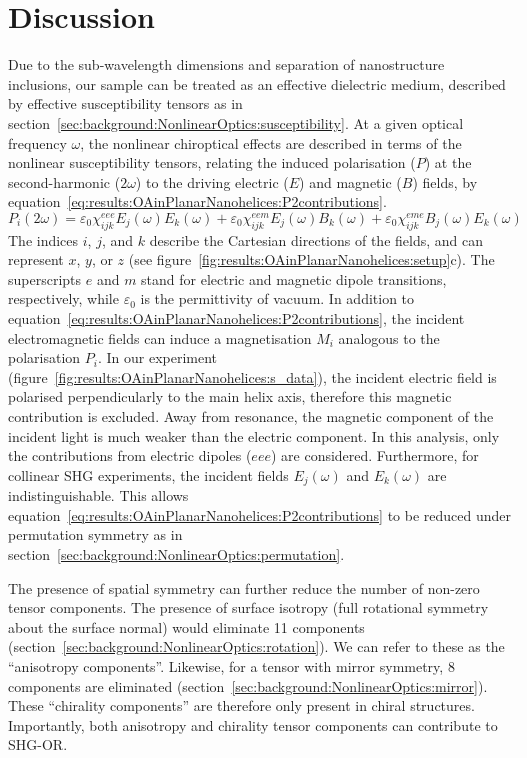 \section{Discussion}\label{sec:results:OAinPlanarNanohelices:discussion}
Due to the sub-wavelength dimensions and separation of nanostructure inclusions, our sample can be treated as an effective dielectric medium, described by effective susceptibility tensors as in section~\ref{sec:background:NonlinearOptics:susceptibility}.
At a given optical frequency $\omega$, the nonlinear chiroptical effects are described in terms of the nonlinear susceptibility tensors, relating the induced polarisation ($P$) at the second-harmonic ($2\omega$) to the driving electric ($E$) and magnetic ($B$) fields, by equation~\ref{eq:results:OAinPlanarNanohelices:P2contributions}.
\begin{equation}\label{eq:results:OAinPlanarNanohelices:P2contributions}	
    {P_i}\left( {2\omega } \right) = 
    \varepsilon{_0}\chi_{ijk}^{eee}{E_j}\left(\omega \right){E_k}\left(\omega \right) + \varepsilon{_0}\chi_{ijk}^{eem}{E_j}\left(\omega \right){B_k}\left(\omega \right) + \varepsilon{_0}\chi_{ijk}^{eme}{B_j}\left(\omega \right){E_k}\left(\omega \right)
\end{equation}
The indices $i$, $j$, and $k$ describe the Cartesian directions of the fields, and can represent $x$, $y$, or $z$ (see figure~\ref{fig:results:OAinPlanarNanohelices:setup}c). 
The superscripts $e$ and $m$ stand for electric and magnetic dipole transitions, respectively, while $\varepsilon{_0}$ is the permittivity of vacuum. 
In addition to equation~\ref{eq:results:OAinPlanarNanohelices:P2contributions}, the incident electromagnetic fields can induce a magnetisation $M_i$ analogous to the polarisation $P_i$. 
In our experiment (figure~\ref{fig:results:OAinPlanarNanohelices:s_data}), the incident electric field is polarised perpendicularly to the main helix axis, therefore this magnetic contribution is excluded. Away from resonance, the magnetic component of the incident light is much weaker than the electric component. 
In this analysis, only the contributions from electric dipoles ($eee$) are considered. Furthermore, for collinear SHG experiments, the incident fields ${E_j}(\omega)$ and ${E_k}(\omega)$ are indistinguishable. This allows equation~\ref{eq:results:OAinPlanarNanohelices:P2contributions} to be reduced under permutation symmetry as in section~\ref{sec:background:NonlinearOptics:permutation}.

The presence of spatial symmetry can further reduce the number of non-zero tensor components. The presence of surface isotropy (full rotational symmetry about the surface normal) would eliminate 11 components (section~\ref{sec:background:NonlinearOptics:rotation}). We can refer to these as the ``anisotropy components''. Likewise, for a tensor with mirror symmetry, 8 components are eliminated  (section~\ref{sec:background:NonlinearOptics:mirror}). These ``chirality components'' are therefore only present in chiral structures. Importantly, both anisotropy and chirality tensor components can contribute to SHG-OR. 

